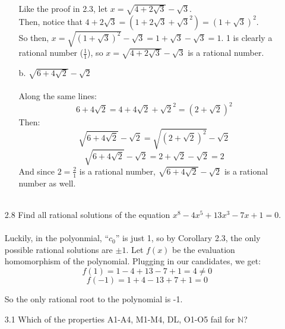 \begin{itemize}
\begin{itemize}
        Like the proof in 2.3, let $x = \sqrt{4 + 2\sqrt{3}} - \sqrt{3}$.\\
        Then, notice that $4 + 2\sqrt{3} = (1 + 2\sqrt{3} + \sqrt{3}^2) = (1 + \sqrt{3})^2$.\\
        So then, $x = \sqrt{(1+\sqrt{3})^2} - \sqrt{3} = 1 + \sqrt{3} - \sqrt{3} = 1$. 1 is clearly a rational number ($\frac{1}{1}$), so $x = \sqrt{4 + 2\sqrt{3}} - \sqrt{3}$ is a rational number.

      \item [b.]
        $\sqrt{6 + 4\sqrt{2}} - \sqrt{2}$\\\\

        Along the same lines: 
        $$6 + 4\sqrt{2} = 4 + 4\sqrt{2} + \sqrt{2}^2 = (2 + \sqrt{2})^2$$
        Then:
        $$\sqrt{6 + 4\sqrt{2}} - \sqrt{2} = \sqrt{(2 + \sqrt{2})^2} - \sqrt{2}$$
        $$\sqrt{6 + 4\sqrt{2}} - \sqrt{2} = 2 + \sqrt{2} - \sqrt{2} = 2$$
        And since $2 = \frac{2}{1}$ is a rational number, $\sqrt{6 + 4\sqrt{2}} - \sqrt{2}$ is a rational number as well.\\\\
    \end{itemize}
  \item[2.8]
    Find all rational solutions of the equation $x^8 - 4x^5 + 13x^3 - 7x + 1 = 0$.\\\\

    Luckily, in the polyonmial, ``$c_0$'' is just 1, so by Corollary 2.3, the only possible rational solutions are $\pm 1$. Let $f(x)$ be the evaluation homomorphism of the polynomial. Plugging in our candidates, we get:
    $$f(1) = 1 - 4 + 13 - 7 + 1 = 4 \neq 0$$
    $$f(-1) = 1 + 4 - 13 + 7 + 1 = 0$$

    So the only rational root to the polynomial is -1.
  \item[3.1]
    Which of the properties A1-A4, M1-M4, DL, O1-O5 fail for $\mathds{N}$?


\end{itemize}
